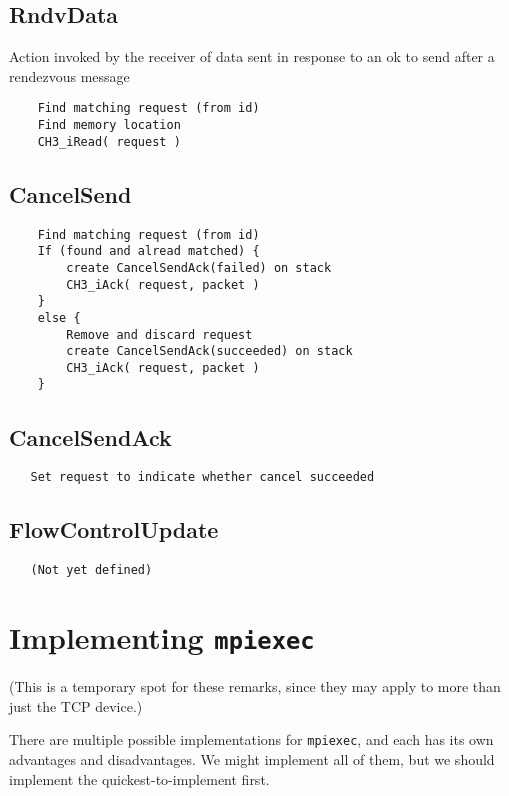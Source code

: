 \documentclass{article}
\def\code#1{\texttt{#1}}
\begin{document}
\subsection{RndvData}
Action invoked by the receiver of data sent in response to an ok to send after
a rendezvous message
\begin{verbatim}
    Find matching request (from id)
    Find memory location
    CH3_iRead( request )
\end{verbatim}

\subsection{CancelSend}
\begin{verbatim}
    Find matching request (from id)
    If (found and alread matched) {
        create CancelSendAck(failed) on stack
        CH3_iAck( request, packet )
    }
    else {
        Remove and discard request
        create CancelSendAck(succeeded) on stack
        CH3_iAck( request, packet )
    }
 \end{verbatim}

\subsection{CancelSendAck}
\begin{verbatim}
   Set request to indicate whether cancel succeeded
\end{verbatim}

\subsection{FlowControlUpdate}
\begin{verbatim}
   (Not yet defined)
\end{verbatim}


\section{Implementing \code{mpiexec}}
\label{sec:mpiexec}

(This is a temporary spot for these remarks, since they may apply to more than
just the TCP device.)

There are multiple possible implementations for \code{mpiexec}, and each has
its own advantages and disadvantages.  We might implement all of them, but we
should implement the quickest-to-implement first.
\end{document}
